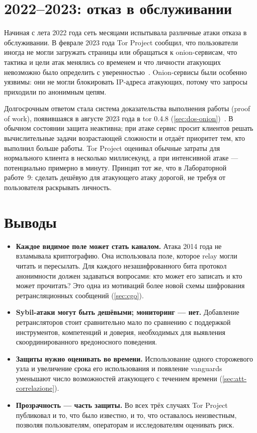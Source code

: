 \section{2022--2023: отказ в обслуживании}\label{sec:casi-dos}

Начиная с лета 2022 года сеть месяцами испытывала различные атаки отказа в обслуживании. В феврале 2023 года Tor Project сообщил, что пользователи иногда не могли загружать страницы или обращаться к onion-сервисам, что тактика и цели атак менялись со временем и что личности атакующих невозможно было определить с уверенностью~\cite{torblog2023dos}. Onion-сервисы были особенно уязвимы: они не могли блокировать IP-адреса атакующих, потому что запросы приходили по анонимным цепям.

Долгосрочным ответом стала система доказательства выполнения работы (proof of work), появившаяся в августе 2023 года в tor 0.4.8 (\cref{sec:dos-onion})~\cite{torblog2023pow}. В обычном состоянии защита неактивна; при атаке сервис просит клиентов решать вычислительные задачи возрастающей сложности и отдаёт приоритет тем, кто выполнил больше работы. Tor Project оценивал обычные затраты для нормального клиента в несколько миллисекунд, а при интенсивной атаке — потенциально примерно в минуту. Принцип тот же, что в Лабораторной работе~9: сделать дешёвую для атакующего атаку дорогой, не требуя от пользователя раскрывать личность.

\section{Выводы}\label{sec:casi-lezioni}

\begin{itemize}
  \item \textbf{Каждое видимое поле может стать каналом.} Атака 2014 года не взламывала криптографию. Она использовала поле, которое relay могли читать и пересылать. Для каждого незашифрованного бита протокол анонимности должен задаваться вопросами: кто может его записать и кто может прочитать? Это одна из мотиваций более новой схемы шифрования ретрансляционных сообщений (\cref{sec:cgo}).
  \item \textbf{Sybil-атаки могут быть дешёвыми; мониторинг — нет.} Добавление ретрансляторов стоит сравнительно мало по сравнению с поддержкой инструментов, компетенций и доверия, необходимых для выявления скоординированного вредоносного поведения.
  \item \textbf{Защиты нужно оценивать во времени.} Использование одного сторожевого узла и увеличение срока его использования и появление vanguards уменьшают число возможностей атакующего с течением времени (\cref{sec:att-correlazione}).
  \item \textbf{Прозрачность — часть защиты.} Во всех трёх случаях Tor Project публиковал и то, что было известно, и то, что оставалось неизвестным, позволяя пользователям, операторам и исследователям оценивать риск.
\end{itemize}

